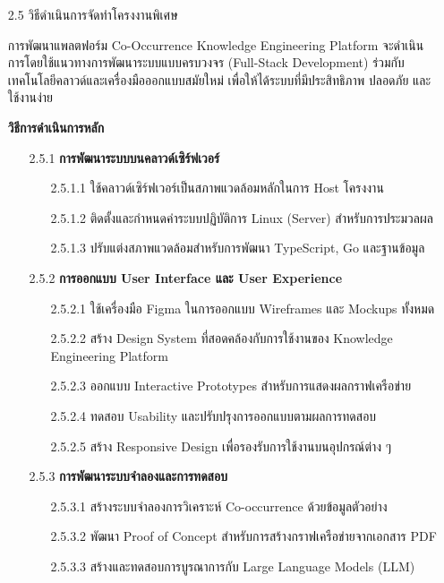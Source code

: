 \documentclass[12pt,a4paper]{article}
\newcommand{\textlight}[1]{{\thailightfont #1}}
\begin{document}
\begin{enumerate}[leftmargin=2cm]
    \vspace{2.3cm}

    \item[2.5] วิธีดำเนินการจัดทำโครงงานพิเศษ
    \vspace{0.05cm}
    \\
    \textlight{
        \hspace{1cm}การพัฒนาแพลตฟอร์ม Co-Occurrence Knowledge Engineering Platform จะดำเนินการโดยใช้แนวทางการพัฒนาระบบแบบครบวงจร (Full-Stack Development) ร่วมกับเทคโนโลยีคลาวด์และเครื่องมือออกแบบสมัยใหม่ เพื่อให้ได้ระบบที่มีประสิทธิภาพ ปลอดภัย และใช้งานง่าย

        \vspace{0.5cm}

        \textbf{วิธีการดำเนินการหลัก}

        \begin{enumerate}
            \item[2.5.1] \textbf{การพัฒนาระบบบนคลาวด์เซิร์ฟเวอร์}
            \begin{enumerate}
                \item[2.5.1.1] ใช้คลาวด์เซิร์ฟเวอร์เป็นสภาพแวดล้อมหลักในการ Host โครงงาน
                \item[2.5.1.2] ติดตั้งและกำหนดค่าระบบปฏิบัติการ Linux (Server) สำหรับการประมวลผล
                \item[2.5.1.3] ปรับแต่งสภาพแวดล้อมสำหรับการพัฒนา TypeScript, Go และฐานข้อมูล
            \end{enumerate}

            \item[2.5.2] \textbf{การออกแบบ User Interface และ User Experience}
            \begin{enumerate}
                \item[2.5.2.1] ใช้เครื่องมือ Figma ในการออกแบบ Wireframes และ Mockups ทั้งหมด
                \item[2.5.2.2] สร้าง Design System ที่สอดคล้องกับการใช้งานของ Knowledge Engineering Platform
                \item[2.5.2.3] ออกแบบ Interactive Prototypes สำหรับการแสดงผลกราฟเครือข่าย
                \item[2.5.2.4] ทดสอบ Usability และปรับปรุงการออกแบบตามผลการทดสอบ
                \item[2.5.2.5] สร้าง Responsive Design เพื่อรองรับการใช้งานบนอุปกรณ์ต่าง ๆ
            \end{enumerate}

            \item[2.5.3] \textbf{การพัฒนาระบบจำลองและการทดสอบ}
            \begin{enumerate}
                \item[2.5.3.1] สร้างระบบจำลองการวิเคราะห์ Co-occurrence ด้วยข้อมูลตัวอย่าง
                \item[2.5.3.2] พัฒนา Proof of Concept สำหรับการสร้างกราฟเครือข่ายจากเอกสาร PDF
                \item[2.5.3.3] สร้างและทดสอบการบูรณาการกับ Large Language Models (LLM)
            \end{enumerate}


\end{enumerate}}
\end{enumerate}
\end{document}
